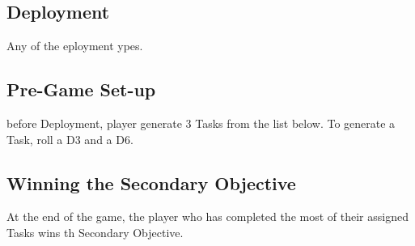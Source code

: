 
\label{MultipleObjectives}

\subsection*{Deployment}

Any of the  eployment ypes.

\subsection*{Pre-Game Set-up}

 before  Deployment,  player generate 3 Tasks  from the list below. To generate a Task, roll a D3 and a D6.

\subsection*{Winning the Secondary Objective}

At the end of the game, the player who has completed the most of their assigned Tasks wins th Secondary Objective.

